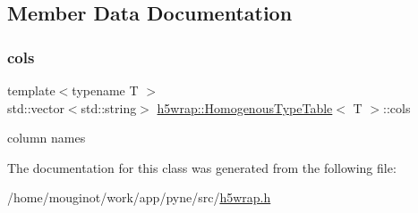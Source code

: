 \subsection{Member Data Documentation}
\mbox{\label{classh5wrap_1_1_homogenous_type_table_a8b60fa54475f44bea26caab0137d8507}} 
\subsubsection{\texorpdfstring{cols}{cols}}
{\footnotesize\ttfamily template$<$typename T $>$ \\
std\+::vector$<$std\+::string$>$ \hyperlink{classh5wrap_1_1_homogenous_type_table}{h5wrap\+::\+Homogenous\+Type\+Table}$<$ T $>$\+::cols}

column names 

The documentation for this class was generated from the following file\+:\begin{DoxyCompactItemize}
\item 
/home/mouginot/work/app/pyne/src/\hyperlink{h5wrap_8h}{h5wrap.\+h}\end{DoxyCompactItemize}
